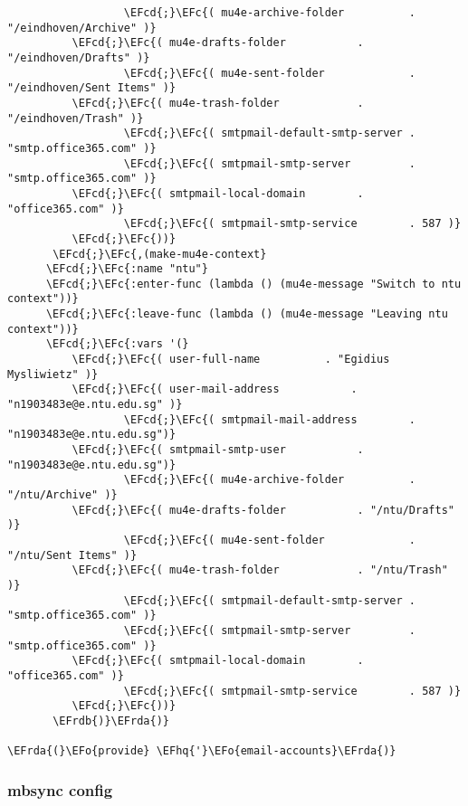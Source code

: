 \documentclass[a4wide,10pt]{article}
\newcommand{\EFc}[1]{\textcolor{EFc}{#1}} %
\newcommand{\EFcd}[1]{\textcolor{EFcd}{#1}} %
\newcommand{\EFo}[1]{\textcolor{EFo}{#1}} %
\newcommand{\EFhq}[1]{\textcolor{EFhq}{#1}} %
\newcommand{\EFrda}[1]{\textcolor{EFrda}{#1}} %
\newcommand{\EFrdb}[1]{\textcolor{EFrdb}{#1}} %
\begin{document}
\begin{Code}
\begin{Verbatim}
                  \EFcd{;}\EFc{( mu4e-archive-folder          . "/eindhoven/Archive" )}
		  \EFcd{;}\EFc{( mu4e-drafts-folder           . "/eindhoven/Drafts" )}
                  \EFcd{;}\EFc{( mu4e-sent-folder             . "/eindhoven/Sent Items" )}
		  \EFcd{;}\EFc{( mu4e-trash-folder            . "/eindhoven/Trash" )}
                  \EFcd{;}\EFc{( smtpmail-default-smtp-server . "smtp.office365.com" )}
                  \EFcd{;}\EFc{( smtpmail-smtp-server         . "smtp.office365.com" )}
		  \EFcd{;}\EFc{( smtpmail-local-domain        . "office365.com" )}
                  \EFcd{;}\EFc{( smtpmail-smtp-service        . 587 )}
		  \EFcd{;}\EFc{))}
       \EFcd{;}\EFc{,(make-mu4e-context}
	  \EFcd{;}\EFc{:name "ntu"}
	  \EFcd{;}\EFc{:enter-func (lambda () (mu4e-message "Switch to ntu context"))}
	  \EFcd{;}\EFc{:leave-func (lambda () (mu4e-message "Leaving ntu context"))}
	  \EFcd{;}\EFc{:vars '(}
		  \EFcd{;}\EFc{( user-full-name	         . "Egidius Mysliwietz" )}
		  \EFcd{;}\EFc{( user-mail-address	         . "n1903483e@e.ntu.edu.sg" )}
                  \EFcd{;}\EFc{( smtpmail-mail-address        . "n1903483e@e.ntu.edu.sg")}
		  \EFcd{;}\EFc{( smtpmail-smtp-user           . "n1903483e@e.ntu.edu.sg")}
                  \EFcd{;}\EFc{( mu4e-archive-folder          . "/ntu/Archive" )}
		  \EFcd{;}\EFc{( mu4e-drafts-folder           . "/ntu/Drafts" )}
                  \EFcd{;}\EFc{( mu4e-sent-folder             . "/ntu/Sent Items" )}
		  \EFcd{;}\EFc{( mu4e-trash-folder            . "/ntu/Trash" )}
                  \EFcd{;}\EFc{( smtpmail-default-smtp-server . "smtp.office365.com" )}
                  \EFcd{;}\EFc{( smtpmail-smtp-server         . "smtp.office365.com" )}
		  \EFcd{;}\EFc{( smtpmail-local-domain        . "office365.com" )}
                  \EFcd{;}\EFc{( smtpmail-smtp-service        . 587 )}
		  \EFcd{;}\EFc{))}
       \EFrdb{)}\EFrda{)}

\EFrda{(}\EFo{provide} \EFhq{'}\EFo{email-accounts}\EFrda{)}
\end{Verbatim}
\end{Code}
\subsubsection{mbsync config}
\label{sec:org61ea342}
\end{document}
